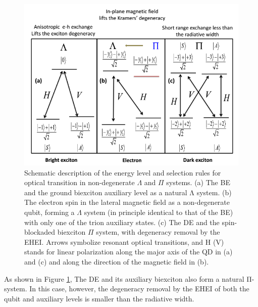 \begin{figure}[H]
	\centering
	\includegraphics[scale=0.8]{figures/Lambda_System.png}
	\caption{Schematic description of the energy level and selection rules for
optical transition in non-degenerate $\Lambda$ and $\Pi$ systems. (a) The BE and the ground biexciton auxiliary level as a natural Λ system. (b) The electron spin in the lateral magnetic field as a non-degenerate qubit, forming a $\Lambda$ system (in principle identical to that of the BE) with only one of the trion auxiliary states. (c) The DE and the spin-blockaded biexciton $\Pi$ system, with degeneracy removal by the EHEI. Arrows symbolize resonant optical transitions, and H (V) stands for linear polarization along the major axis of the QD in (a) and (c) and along the direction of the magnetic field in (b).}
	\label{fig:LambdaSystem}
\end{figure}
As shown in Figure \ref{fig:LambdaSystem}, The DE and its auxiliary biexciton also form a natural Π-system. In this case, however, the degeneracy removal by the EHEI of both the qubit and auxiliary levels is smaller than the radiative width. 
